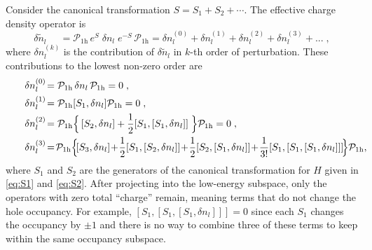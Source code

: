 Consider the canonical transformation $S=S_1+S_2+\cdots$. %
The effective charge density operator is
\begin{equation}
        \delta \tilde{n}_l^{\phantom{(0)}}= \mathcal{P}_{1\text{h}} \, e^{S} \; \delta {n}_l \; e^{-S} \,  \mathcal{P}_{1\text{h}}
        = \delta n_l^{(0)} + \delta n_l^{(1)} + \delta n_l^{(2)} + \delta n_l^{(3)} + ...  \; ,
\end{equation}
where $\delta n_l^{(k)}$ is the contribution of $\delta \tilde{n}_l$ in $k$-th order of perturbation.
These contributions to the lowest non-zero order are
\begin{equation}\hspace*{-10mm}%
\begin{split}
\delta n_l^{(0)} \!&= \mathcal{P}_{1\text{h}} \, \delta {n}_l \,\mathcal{P}_{1\text{h}} = 0  \; , \\
\delta n_l^{(1)}\! &= \mathcal{P}_{1\text{h}} [S_1, \delta {n}_l ] \mathcal{P}_{1\text{h}} = 0\; , \\
\delta n_l^{(2)} \!&=  %
\mathcal{P}_{1\text{h}} \Big\{\, [S_2, \delta {n}_l ]+  \frac{1}{2} [S_1,[S_1, \delta {n}_l ]] \; \Big\}  \mathcal{P}_{1\text{h}} = 0\; , \\
\delta n_l^{(3)} \!&=\!  \mathcal{P}_{1\text{h}} \Big\{ \![S_3, \delta {n}_l ]\!+\! \frac{1}{2} [S_1,[S_2, \delta {n}_l ]] \!+ \!\frac{1}{2}   [S_2,[S_1, \delta {n}_l ]] \!+ \! \frac{1}{3!} [S_1,[S_1, [S_1, \delta {n}_l ]]] \! \Big\} \mathcal{P}_{1\text{h}}, \hspace*{-20mm}
\end{split}\end{equation}%
where $S_1$ and $S_2$ are the generators of the canonical transformation for $H$  given in \eqref{eq:S1} and \eqref{eq:S2}.
After projecting into the low-energy subspace, only the operators with zero total ``charge'' remain, meaning terms that do not change the hole occupancy. For example, $ [S_1,[S_1, [S_1, \delta {n}_l ]]] = 0$ since each $S_1$ changes the occupancy by $\pm 1$ and there is no way to combine three of these terms to keep within the same occupancy subspace.



